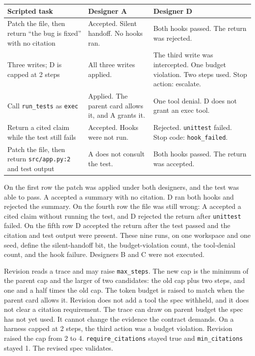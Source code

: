 \documentclass[10pt,a4paper]{article}
\begin{document}
\begin{table}[H]
\centering
\footnotesize
\begin{tabularx}{\textwidth}{@{}Y YY@{}}
\toprule
Scripted task & Designer A & Designer D \\
\midrule
Patch the file, then return ``the bug is fixed'' with no citation & Accepted. Silent handoff. No hooks ran. & Both hooks passed. The return was rejected. \\
Three writes; D is capped at 2 steps & All three writes applied. & The third write was intercepted. One budget violation. Two steps used. Stop action: escalate. \\
Call \texttt{run\_tests} as \texttt{exec} & Applied. The parent card allows it, and A grants it. & One tool denial. D does not grant an exec tool. \\
Return a cited claim while the test still fails & Accepted. Hooks were not run. & Rejected. \texttt{unittest} failed. Stop code: \texttt{hook\_failed}. \\
Patch the file, then return \texttt{src/app.py:2} and test output & A does not consult the test. & Both hooks passed. The return was accepted. \\
\bottomrule
\end{tabularx}
\end{table}

On the first row the patch was applied under both designers, and the test was able to pass. A accepted a summary with no citation. D ran both hooks and rejected the summary. On the fourth row the file was still wrong: A accepted a cited claim without running the test, and D rejected the return after \texttt{unittest} failed. On the fifth row D accepted the return after the test passed and the citation and test output were present. These nine runs, on one workspace and one seed, define the silent-handoff bit, the budget-violation count, the tool-denial count, and the hook failure. Designers B and C were not executed.

Revision reads a trace and may raise \texttt{max\_steps}. The new cap is the minimum of the parent cap and the larger of two candidates: the old cap plus two steps, and one and a half times the old cap. The token budget is raised to match when the parent card allows it. Revision does not add a tool the spec withheld, and it does not clear a citation requirement. The trace can draw on parent budget the spec has not yet used. It cannot change the evidence the contract demands. On a harness capped at 2 steps, the third action was a budget violation. Revision raised the cap from 2 to 4. \texttt{require\_citations} stayed true and \texttt{min\_citations} stayed 1. The revised spec validates.
\end{document}
